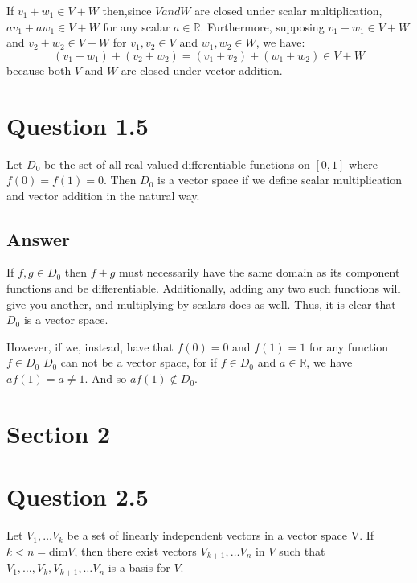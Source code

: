 \documentclass[
	12pt, %
]{fphw}
\begin{document}
If $v_1+w_1 \in V+W$ then,since $V and W$ are closed under scalar multiplication,
$av_1+aw_1 \in V+W$ for any scalar $a \in \mathbb{R}$.
Furthermore, supposing $v_1 + w_1 \in V+W$ and $v_2 + w_2 \in V+W$ for $v_1, v_2 \in V$
and $w_1, w_2 \in W$, we have: 
	$$(v_1+w_1)+(v_2+w_2)=(v_1+v_2)+(w_1+w_2) \in V+W $$
because both $V$ and $W$ are closed under vector addition.

	

\section*{Question 1.5}

\begin{problem}
	Let $D_0$ be the set of all real-valued differentiable functions on $[0,1]$
where $f(0)=f(1)=0$. Then $D_0$ is a vector space if we define scalar multiplication and vector addition in the natural way.
\end{problem}


\subsection*{Answer} 
If $f,g \in D_0$ then $f+g$ must necessarily have the same domain as its component functions 
and be differentiable. Additionally, adding any two such functions will give you another, and multiplying by scalars does as well. Thus, it is clear that $D_0$ is a vector space. 

However, if we, instead, have that $f(0)=0$ and $f(1)=1$ for any function $f \in D_0$
$D_0$ can not be a vector space, for if $f \in D_0$ and $a \in \mathbb{R}$, we have
$af(1)=a \neq 1$. 
And so $af(1) \notin D_0$.

\section*{Section 2}
\section*{Question 2.5}
\begin{problem}
	Let $V_1, \dots V_k$ be a set of linearly independent vectors in a vector space V. 
	If $k<n=\text{dim} V$, then there exist vectors $V_{k+1}, \dots V_n$
	in $V$ such that $V_1, \dots, V_k, V_{k+1}, \dots V_n$ is a basis 
	for $V$.
\end{problem}
\end{document}
